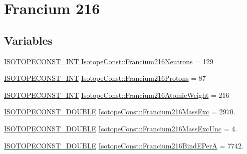 \hypertarget{group___isotope_const-_francium-_fr216}{}\section{Francium 216}
\label{group___isotope_const-_francium-_fr216}
\subsection*{Variables}
\begin{DoxyCompactItemize}
\item 
\mbox{\hyperlink{group___isotope_const-_macros_ga5f18360b3e99483a35c32d789e62621c}{I\+S\+O\+T\+O\+P\+E\+C\+O\+N\+S\+T\+\_\+\+I\+NT}} \mbox{\hyperlink{group___isotope_const-_francium-_fr216_ga99c3c14649611d55bc75bfd815a268d4}{Isotope\+Const\+::\+Francium216\+Neutrons}} = 129
\item 
\mbox{\hyperlink{group___isotope_const-_macros_ga5f18360b3e99483a35c32d789e62621c}{I\+S\+O\+T\+O\+P\+E\+C\+O\+N\+S\+T\+\_\+\+I\+NT}} \mbox{\hyperlink{group___isotope_const-_francium-_fr216_ga6f641b20e2a7e7fa180113ba87470a21}{Isotope\+Const\+::\+Francium216\+Protons}} = 87
\item 
\mbox{\hyperlink{group___isotope_const-_macros_ga5f18360b3e99483a35c32d789e62621c}{I\+S\+O\+T\+O\+P\+E\+C\+O\+N\+S\+T\+\_\+\+I\+NT}} \mbox{\hyperlink{group___isotope_const-_francium-_fr216_ga412be196b659e2fc49d521ec29c4723b}{Isotope\+Const\+::\+Francium216\+Atomic\+Weight}} = 216
\item 
\mbox{\hyperlink{group___isotope_const-_macros_ga8f45a7272ce02c0b4c65c44636ed719a}{I\+S\+O\+T\+O\+P\+E\+C\+O\+N\+S\+T\+\_\+\+D\+O\+U\+B\+LE}} \mbox{\hyperlink{group___isotope_const-_francium-_fr216_gaae5d0785a8e3119737b35f9f67ac3b36}{Isotope\+Const\+::\+Francium216\+Mass\+Exc}} = 2970.
\item 
\mbox{\hyperlink{group___isotope_const-_macros_ga8f45a7272ce02c0b4c65c44636ed719a}{I\+S\+O\+T\+O\+P\+E\+C\+O\+N\+S\+T\+\_\+\+D\+O\+U\+B\+LE}} \mbox{\hyperlink{group___isotope_const-_francium-_fr216_ga4b1769ed6c9dc5602bf05dd0d1b28297}{Isotope\+Const\+::\+Francium216\+Mass\+Exc\+Unc}} = 4.
\item 
\mbox{\hyperlink{group___isotope_const-_macros_ga8f45a7272ce02c0b4c65c44636ed719a}{I\+S\+O\+T\+O\+P\+E\+C\+O\+N\+S\+T\+\_\+\+D\+O\+U\+B\+LE}} \mbox{\hyperlink{group___isotope_const-_francium-_fr216_ga4034f25525f05e9f7c8a31e9c99286e2}{Isotope\+Const\+::\+Francium216\+Bind\+E\+PerA}} = 7742.
\item 

\end{DoxyCompactItemize}
